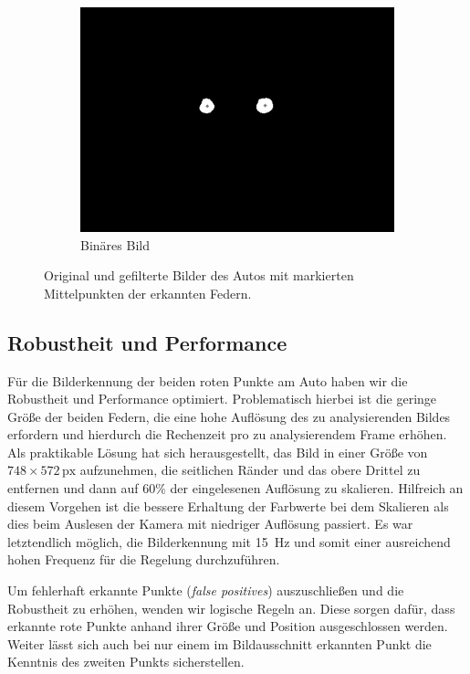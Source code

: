 \documentclass[10pt]{article}
\begin{document}
\begin{figure}[htbp]
\begin{subfigure}[b]{0.3\textwidth}
        \includegraphics[width=\textwidth]{crob_image_dots}
        \caption{Binäres Bild}\label{fig:car_bin}
    \end{subfigure}
        \caption{Original und gefilterte Bilder des Autos mit markierten Mittelpunkten der erkannten Federn.}\label{fig:cars}
    \end{figure}


    \subsection{Robustheit und Performance}\label{sub:robustheit_und_performance}
        Für die Bilderkennung der beiden roten Punkte am Auto haben wir die Robustheit und Performance optimiert.
        Problematisch hierbei ist die geringe Größe der beiden Federn, die eine hohe Auflösung des zu analysierenden Bildes erfordern und hierdurch die Rechenzeit pro zu analysierendem Frame erhöhen.
        Als praktikable Lösung hat sich herausgestellt, das Bild in einer Größe von $748\times 572\,\text{px}$ aufzunehmen, die seitlichen Ränder und das obere Drittel zu entfernen und dann auf $60\%$ der eingelesenen Auflösung zu skalieren.
        Hilfreich an diesem Vorgehen ist die bessere Erhaltung der Farbwerte bei dem Skalieren als dies beim Auslesen der Kamera mit niedriger Auflösung passiert.
        Es war letztendlich möglich, die Bilderkennung mit \SI{15}{\hertz} und somit einer ausreichend hohen Frequenz für die Regelung durchzuführen.

        Um fehlerhaft erkannte Punkte (\textit{false positives}) auszuschließen und die Robustheit zu erhöhen, wenden wir logische Regeln an.
        Diese sorgen dafür, dass erkannte rote Punkte anhand ihrer Größe und Position ausgeschlossen werden.
        Weiter lässt sich auch bei nur einem im Bildausschnitt erkannten Punkt die Kenntnis des zweiten Punkts sicherstellen.
\end{document}
